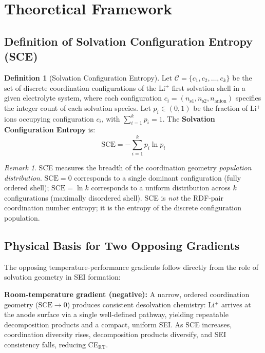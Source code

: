 \documentclass[11pt]{article}
\theoremstyle{plain}
\theoremstyle{definition}
\newtheorem{definition}{Definition}[section]
\theoremstyle{remark}
\newtheorem{remark}{Remark}[section]
\begin{document}
\section{Theoretical Framework}

\subsection{Definition of Solvation Configuration Entropy (SCE)}

\begin{definition}[Solvation Configuration Entropy]
Let $\mathcal{C} = \{c_1, c_2, \ldots, c_k\}$ be the set of discrete coordination
configurations of the Li$^+$ first solvation shell in a given electrolyte system,
where each configuration $c_i = (n_{\text{s1}}, n_{\text{s2}}, n_{\text{anion}})$
specifies the integer count of each solvation species.  Let $p_i \in (0,1)$ be the
fraction of Li$^+$ ions occupying configuration $c_i$, with $\sum_{i=1}^{k} p_i = 1$.
The \textbf{Solvation Configuration Entropy} is:
\begin{equation}
  \mathrm{SCE} = -\sum_{i=1}^{k} p_i \ln p_i
  \label{eq:SCE_def}
\end{equation}
\end{definition}

\begin{remark}
SCE measures the breadth of the coordination geometry \emph{population
distribution}.  $\mathrm{SCE}=0$ corresponds to a single dominant configuration
(fully ordered shell); $\mathrm{SCE} = \ln k$ corresponds to a uniform
distribution across $k$ configurations (maximally disordered shell).  SCE
is \emph{not} the RDF-pair coordination number entropy; it is the entropy of the
discrete configuration population.
\end{remark}

\subsection{Physical Basis for Two Opposing Gradients}

The opposing temperature-performance gradients follow directly from the role of
solvation geometry in SEI formation:

\medskip\noindent\textbf{Room-temperature gradient (negative):}
A narrow, ordered coordination geometry ($\mathrm{SCE} \to 0$) produces
consistent desolvation chemistry: Li$^+$ arrives at the anode surface via a
single well-defined pathway, yielding repeatable decomposition products and
a compact, uniform SEI.  As SCE increases, coordination diversity rises,
decomposition products diversify, and SEI consistency falls, reducing
CE$_{\mathrm{RT}}$.
\end{document}
